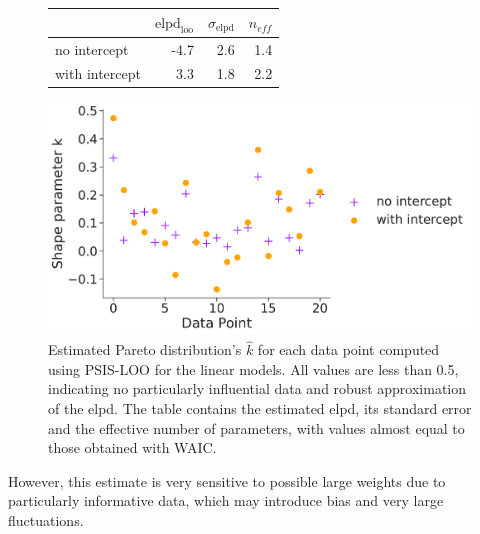 \begin{figure}[t]
  \begin{minipage}{0.4\linewidth}
   \begin{tabular}{lrrr}
\toprule
 &  $\text{elpd}_{\text{loo}}$ & $\sigma_{\text{elpd}}$ &  $n_{eff}$ \\
\midrule
no intercept   &     -4.7 & 2.6 &   1.4 \\
with intercept &      3.3 & 1.8 &   2.2 \\
\bottomrule
\end{tabular}
  \end{minipage}
  \hfill
  \begin{minipage}{0.5\linewidth}
    \includegraphics[width=\linewidth]{figures/ch2/linear/loo_khat_0.pdf}
  \end{minipage} 
\caption{Estimated Pareto distribution's $\hat{k}$ for each data point computed using PSIS-LOO for the linear models. All values are less than
  0.5, indicating no particularly influential data and robust approximation of the elpd. The table contains the
estimated elpd, its standard error and the effective number of parameters, with values almost equal to those obtained
with WAIC.}
\label{loo}
\end{figure}
However, this estimate is very sensitive to possible large weights due to particularly informative data, which may
introduce bias and very large fluctuations. 

